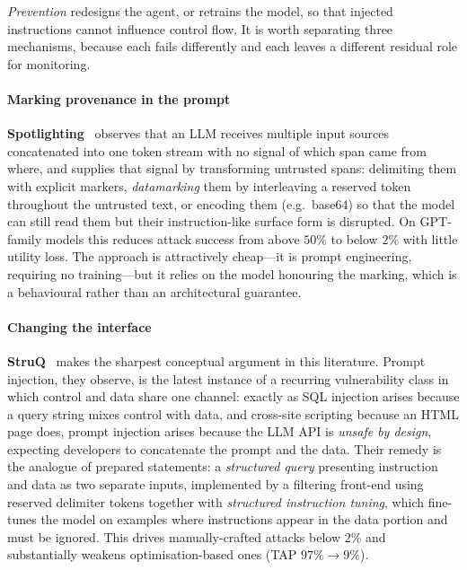 \documentclass[preprint,12pt,number]{elsarticle}
\theoremstyle{definition}
\begin{document}
\emph{Prevention} redesigns the agent, or retrains the model, so that injected
instructions cannot influence control flow. It is worth separating three
mechanisms, because each fails differently and each leaves a different residual
role for monitoring.

\paragraph{Marking provenance in the prompt}
\textbf{Spotlighting}~\citep{hines2024spotlighting} observes that an LLM receives
multiple input sources concatenated into one token stream with no signal of which
span came from where, and supplies that signal by transforming untrusted spans:
delimiting them with explicit markers, \emph{datamarking} them by interleaving a
reserved token throughout the untrusted text, or encoding them (e.g.\ base64) so
that the model can still read them but their instruction-like surface form is
disrupted. On GPT-family models this reduces attack success from above $50\%$ to
below $2\%$ with little utility loss. The approach is attractively cheap---it is
prompt engineering, requiring no training---but it relies on the model honouring
the marking, which is a behavioural rather than an architectural guarantee.

\paragraph{Changing the interface}
\textbf{StruQ}~\citep{chen2025struq} makes the sharpest conceptual argument in
this literature. Prompt injection, they observe, is the latest instance of a
recurring vulnerability class in which control and data share one channel:
exactly as SQL injection arises because a query string mixes control with data,
and cross-site scripting because an HTML page does, prompt injection arises
because the LLM API is \emph{unsafe by design}, expecting developers to
concatenate the prompt and the data. Their remedy is the analogue of prepared
statements: a \emph{structured query} presenting instruction and data as two
separate inputs, implemented by a filtering front-end using reserved delimiter
tokens together with \emph{structured instruction tuning}, which fine-tunes the
model on examples where instructions appear in the data portion and must be
ignored. This drives manually-crafted attacks below $2\%$ and substantially
weakens optimisation-based ones (TAP $97\% \to 9\%$).
\end{document}
